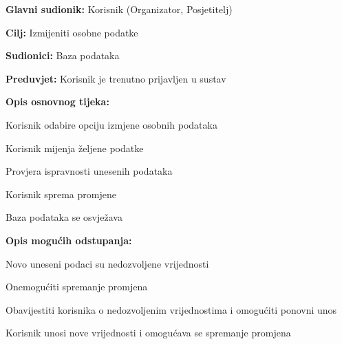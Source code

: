 					
					\noindent {}
					\begin{packed_item}
						
						\item \textbf{Glavni sudionik:} Korisnik (Organizator, Posjetitelj)
						\item  \textbf{Cilj:} Izmijeniti osobne podatke 
						\item  \textbf{Sudionici:} Baza podataka
						\item  \textbf{Preduvjet:} Korisnik je trenutno prijavljen u sustav
						\item  \textbf{Opis osnovnog tijeka:}
						
						\item[] \begin{packed_enum}
							
							\item Korisnik odabire opciju izmjene osobnih podataka
							\item Korisnik mijenja željene podatke 
							\item Provjera ispravnosti unesenih podataka 
							\item Korisnik sprema promjene
							\item Baza podataka se osvježava 
							
						\end{packed_enum}
						
						\item  \textbf{Opis mogućih odstupanja:}
						
						\item[] \begin{packed_item}
							
							\item[2.a] Novo uneseni podaci su nedozvoljene vrijednosti
							\item[] \begin{packed_enum}
								
								\item Onemogućiti spremanje promjena
								\item Obavijestiti korisnika o nedozvoljenim vrijednostima i omogućiti ponovni unos 
								\item Korisnik unosi nove vrijednosti i omogućava se spremanje promjena
								
							\end{packed_enum}
							

\end{packed_item}
\end{packed_item}
